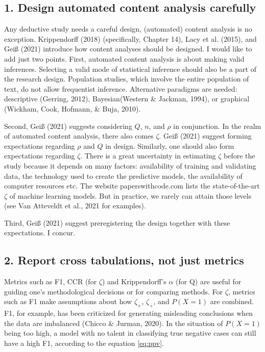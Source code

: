 \documentclass[english,man,floatsintext]{apa6}
\begin{document}
\hypertarget{design-automated-content-analysis-carefully}{%
\subsection{1. Design automated content analysis carefully}\label{design-automated-content-analysis-carefully}}

Any deductive study needs a careful design, (automated) content analysis is no exception. Krippendorff (2018) (specifically, Chapter 14), Lacy et al. (2015), and Geiß (2021) introduce how content analyses should be designed. I would like to add just two points. First, automated content analysis is about making valid inferences. Selecting a valid mode of statistical inference should also be a part of the research design. Population studies, which involve the entire population of text, do not allow frequentist inference. Alternative paradigms are needed: descriptive (Gerring, 2012), Bayesian(Western \& Jackman, 1994), or graphical (Wickham, Cook, Hofmann, \& Buja, 2010).

Second, Geiß (2021) suggests considering \(Q\), \(n\), and \(\rho\) in conjunction. In the realm of automated content analysis, there also comes \(\zeta\). Geiß (2021) suggest forming expectations regarding \(\rho\) and \(Q\) in design. Similarly, one should also form expectations regarding \(\zeta\). There is a great uncertainty in estimating \(\zeta\) before the study because it depends on many factors: availability of training and validating data, the technology used to create the predictive models, the availability of computer resources etc. The website paperswithcode.com lists the state-of-the-art \(\zeta\) of machine learning models. But in practice, we rarely can attain those levels (see Van Atteveldt et al., 2021 for examples).

Third, Geiß (2021) suggest preregistering the design together with these expectations. I concur.

\hypertarget{report-cross-tabulations-not-just-metrics}{%
\subsection{2. Report cross tabulations, not just metrics}\label{report-cross-tabulations-not-just-metrics}}

Metrics such as F1, CCR (for \(\zeta\)) and Krippendorff's \(\alpha\) (for Q) are useful for guiding one's methodological decisions or for comparing methods. For \(\zeta\), metrics such as F1 make assumptions about how \(\zeta_{+}\), \(\zeta_{+}\), and \(P(X=1)\) are combined. F1, for example, has been criticized for generating misleading conclusions when the data are imbalanced (Chicco \& Jurman, 2020). In the situation of \(P(X=1)\) being too high, a model with no talent in classifying true negative cases can still have a high F1, according to the equation \eqref{eq:ppv}.
\end{document}
